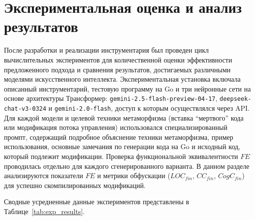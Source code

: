 \section{Экспериментальная оценка и анализ результатов}

После разработки и реализации инструментария был проведен цикл вычислительных экспериментов для количественной оценки эффективности предложенного подхода и сравнения результатов, достигаемых различными моделями искусственного интеллекта. Экспериментальная установка включала описанный инструментарий, тестовую программу на Go и три нейронные сети на основе архитектуры Трансформер: \texttt{gemini-2.5-flash-preview-04-17}, \texttt{deepseek-chat-v3-0324} и \texttt{gemini-2.0-flash}, доступ к которым осуществлялся через API. Для каждой модели и целевой техники метаморфизма (вставка \enquote{мертвого} кода или модификация потока управления) использовался специализированный промпт, содержащий подробное объяснение техники метаморфизма, пример использования, основные замечания по генерации кода на Go и исходный код, который подлежит модификации. Проверка функциональной эквивалентности $FE$ проводилась отдельно для каждого сгенерированного варианта. В данном разделе анализируются показатели $FE$ и метрики обфускации ($LOC_{fin}$, $CC_{fin}$, $CogC_{fin}$) для успешно скомпилированных модификаций.

Сводные усредненные данные экспериментов представлены в Таблице~\ref{tab:exp_results}.

